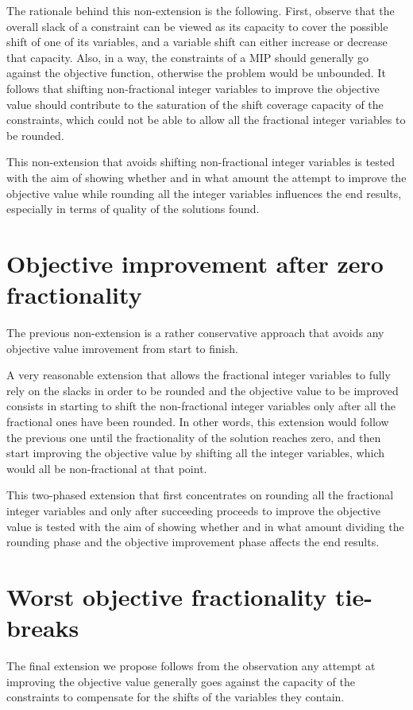 \documentclass[a4paper,12pt]{book}
\begin{document}
The rationale behind this non-extension is the following. First, observe that the overall slack of a constraint can be viewed as its capacity to cover the possible shift of one of its variables, and a variable shift can either increase or decrease that capacity. Also, in a way, the constraints of a MIP should generally go against the objective function, otherwise the problem would be unbounded. It follows that shifting non-fractional integer variables to improve the objective value should contribute to the saturation of the shift coverage capacity of the constraints, which could not be able to allow all the fractional integer variables to be rounded. \par

This non-extension that avoids shifting non-fractional integer variables is tested with the aim of showing whether and in what amount the attempt to improve the objective value while rounding all the integer variables influences the end results, especially in terms of quality of the solutions found.

\section{Objective improvement after zero fractionality}
The previous non-extension is a rather conservative approach that avoids any objective value imrovement from start to finish. \par 

A very reasonable extension that allows the fractional integer variables to fully rely on the slacks in order to be rounded and the objective value to be improved consists in starting to shift the non-fractional integer variables only after all the fractional ones have been rounded. In other words, this extension would follow the previous one until the fractionality of the solution reaches zero, and then start improving the objective value by shifting all the integer variables, which would all be non-fractional at that point. \par

This two-phased extension that first concentrates on rounding all the fractional integer variables and only after succeeding proceeds to improve the objective value is tested with the aim of showing whether and in what amount dividing the rounding phase and the objective improvement phase affects the end results.

\section{Worst objective fractionality tie-breaks}
The final extension we propose follows from the observation any attempt at improving the objective value generally goes against the capacity of the constraints to compensate for the shifts of the variables they contain. \par 
\end{document}
